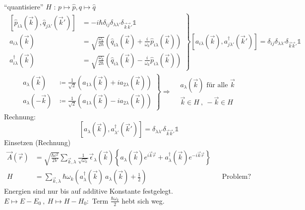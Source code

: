 	``quantisiere'' $H$ : $p \mapsto \hat{p} , q \mapsto \hat{q}$
		\begin{align*}
			\left.
			\begin{aligned}
			\left[ \hat{p}_{i \lambda} (\vec{k}) , \hat{q}_{j \lambda'} (\vec{k}')
			\right]
			&= -i\hbar \delta_{ij} \delta_{\lambda \lambda'} \delta_{\vec{k} \vec{k}'} \mathds{1}
			\\
			a_{i \lambda}(\vec{k}) 
			&= \sqrt{\frac{\omega_k}{2 \hbar}} 
			\left(\hat{q}_{i \lambda} (\vec{k}) + \frac{i}{\omega_k} \hat{p}_{i \lambda} (\vec{k})\right)
			\\
			a^\dagger_{i \lambda}(\vec{k})
			&= \sqrt{\frac{\omega_k}{2 \hbar}}
			\left(\hat{q}_{i \lambda} (\vec{k}) - \frac{i}{\omega_k} \hat{p}_{i \lambda} (\vec{k})\right)
			\end{aligned}
			\right\}
			\left[ a_{i \lambda} (\vec{k}) , a_{j \lambda'}^\dagger (\vec{k}')
			\right] 
			= \delta_{ij} \delta_{\lambda \lambda'} \delta_{\vec{k} \vec{k}'} \mathds{1}
		\end{align*}
		\begin{align*}
			\left.
			\begin{aligned}
				a_\lambda (\vec{k}) 
				&\coloneqq \frac{1}{\sqrt{2}} 
				\left(a_{1 \lambda} (\vec{k}) + i a_{2 \lambda} (\vec{k}) \right) \\
				a_\lambda (-\vec{k}) 
				&\coloneqq \frac{1}{\sqrt{2}} 
				\left(a_{1 \lambda} (\vec{k}) - i a_{2 \lambda} (\vec{k}) \right)
			\end{aligned}
			\right\}
			\Rightarrow 
			\begin{aligned}
				&a_\lambda (\vec{k}) \text{~für alle~} \vec{k} \\
				&\vec{k} \in H ~,~ -\vec{k} \in H
			\end{aligned}
		\end{align*}
	Rechnung:
		\begin{equation*}
			\left[
				a_\lambda (\vec{k}), a_{\lambda'}^\dagger (\vec{k}')
			\right]
			= \delta_{\lambda \lambda'} \delta_{\vec{k} \vec{k}'} \mathds{1}
		\end{equation*}
	Einsetzen (Rechnung)
		\begin{align*}
			\vec{A} (\vec{r}) &= 
			\sqrt{\frac{\hbar c^2}{2 V}} \sum_{\vec{k}, \lambda} \frac{1}{\sqrt{\omega_k}}
			\vec{\epsilon}_\lambda (\vec{k}) 
			\left\{ a_\lambda (\vec{k}) e^{i \vec{k} \vec{r}} 
			+ a^\dagger_\lambda (\vec{k}) e^{-i \vec{k} \vec{r}} 
			\right\}
			\\
			H &= 
			\sum_{\vec{k} , \lambda} \hbar \omega_k
			\left( a^\dagger_\lambda (\vec{k}) ~a_\lambda (\vec{k}) + \frac{1}{2}
			\right) & &\text{Problem?}
		\end{align*}
	Energien sind nur bis auf additive Konstante festgelegt. \\
	$E \mapsto E-E_0 ~,~ H \mapsto H - H_0 :$ Term $\frac{\hbar \omega_k}{2}$ hebt sich weg.
	
